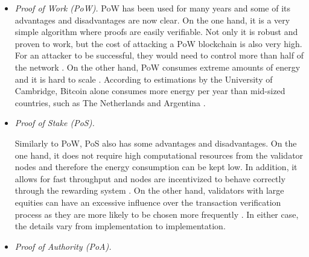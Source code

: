 \begin{itemize}
    \item \textit{Proof of Work (PoW).} PoW has been used for many years and some of its advantages and disadvantages are now clear. On the one hand, it is a very simple algorithm where proofs are easily verifiable. Not only it is robust and proven to work, but the cost of attacking a PoW blockchain is also very high. For an attacker to be successful, they would need to control more than half of the network \cite{li_blockchain_2021}. On the other hand, PoW consumes extreme amounts of energy and it is hard to scale \cite{edwood_2020, li_blockchain_2021}. According to estimations by the University of Cambridge, Bitcoin alone consumes more energy per year than mid-sized countries, such as The Netherlands and Argentina \cite{ccaf}.
    
    \item \textit{Proof of Stake (PoS).}
    
    
    Similarly to PoW, PoS also has some advantages and disadvantages. On the one hand, it does not require high computational resources from the validator nodes and therefore the energy consumption can be kept low. In addition, it allows for fast throughput and nodes are incentivized to behave correctly through the rewarding system \cite{li_blockchain_2021}. On the other hand, validators with large equities can have an excessive influence over the transaction verification process as they are more likely to be chosen more frequently \cite{li_blockchain_2021}. In either case, the details vary from implementation to implementation.
    
    \item \textit{Proof of Authority (PoA).} 
    
    

\end{itemize}
